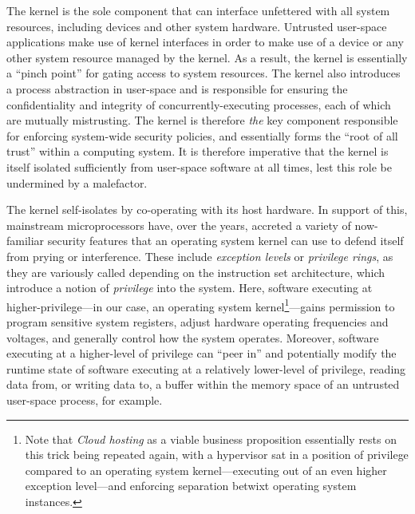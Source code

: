 \documentclass[a4paper, UKenglish, cleveref, autoref, thm-restate, colorlinks]{lipics-v2021}
\begin{document}
The kernel is the sole component that can interface unfettered with all system resources, including devices and other system hardware.
Untrusted user-space applications make use of kernel interfaces in order to make use of a device or any other system resource managed by the kernel.
As a result, the kernel is essentially a ``pinch point'' for gating access to system resources.
The kernel also introduces a process abstraction in user-space and is responsible for ensuring the confidentiality and integrity of concurrently-executing processes, each of which are mutually mistrusting.
The kernel is therefore \emph{the} key component responsible for enforcing system-wide security policies, and essentially forms the ``root of all trust'' within a computing system.
It is therefore imperative that the kernel is itself isolated sufficiently from user-space software at all times, lest this role be undermined by a malefactor.

The kernel self-isolates by co-operating with its host hardware.
In support of this, mainstream microprocessors have, over the years, accreted a variety of now-familiar security features that an operating system kernel can use to defend itself from prying or interference.
These include \emph{exception levels} or \emph{privilege rings}, as they are variously called depending on the instruction set architecture, which introduce a notion of \emph{privilege} into the system.
Here, software executing at higher-privilege---in our case, an operating system kernel\footnote{Note that \emph{Cloud hosting} as a viable business proposition essentially rests on this trick being repeated again, with a hypervisor sat in a position of privilege compared to an operating system kernel---executing out of an even higher exception level---and enforcing separation betwixt operating system instances.}---gains permission to program sensitive system registers, adjust hardware operating frequencies and voltages, and generally control how the system operates.
Moreover, software executing at a higher-level of privilege can ``peer in'' and potentially modify the runtime state of software executing at a relatively lower-level of privilege, reading data from, or writing data to, a buffer within the memory space of an untrusted user-space process, for example.
\end{document}
